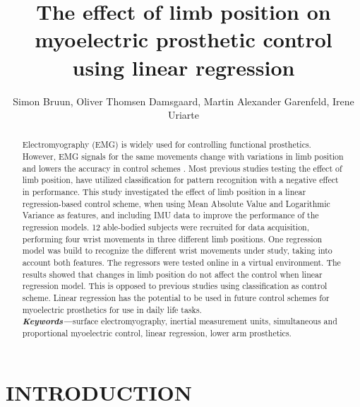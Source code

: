 \documentclass[a4paper, 10pt, conference]{ieeeconf}      %
\title{\LARGE \bf
	The effect of limb position on myoelectric prosthetic control using linear regression
}%
\author{Simon Bruun, Oliver Thomsen Damsgaard, Martin Alexander Garenfeld, Irene Uriarte}%
\begin{document}
		
	\maketitle
	\thispagestyle{empty}
	\pagestyle{empty}
	
	
	\begin{abstract}
%		
Electromyography (EMG) is widely used for controlling functional prosthetics. However, EMG signals for the same movements change with variations in limb position and lowers the accuracy in control schemes \cite{fougner2012}. Most previous studies testing the effect of limb position, have utilized classification for pattern recognition with a negative effect in performance. This study investigated the effect of limb position in a linear regression-based control scheme, when using Mean Absolute Value and Logarithmic Variance as features, and including IMU data to improve the performance of the regression models. 12 able-bodied subjects were recruited for data acquisition, performing four wrist movements in three different limb positions. One regression model was build to recognize the different wrist movements under study, taking into account both features. The regressors were tested online in a virtual environment. The results showed that changes in limb position do not affect the control when linear regression model.
This is opposed to previous studies using classification as control scheme. Linear regression has the potential to be used in future control schemes for myoelectric prosthetics for use in daily life tasks.\\
		
\textit{\textbf{Keywords---}}surface electromyography, inertial measurement units, simultaneous and proportional myoelectric control, linear regression, lower arm prosthetics.
	\end{abstract}
	
	
\section{INTRODUCTION}%
		
\end{document}
